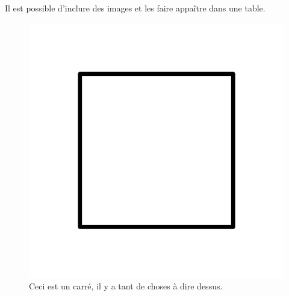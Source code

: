 \documentclass[11pt]{article}
\begin{document}
Il est possible d'inclure des images et les faire appaître dans une table.
\begin{figure}[t]
	\vspace{-0.5cm}
	\includegraphics[width=0.9\linewidth,angle=0]{Carre.png}
	\centering
	\vspace{-1cm}
	\caption[Un carré]{Ceci est un carré, il y a tant de choses à dire dessus.}%
	\label{image:carre}
\end{figure}

\begin{appendix}
	\label{appendix:calculs_en_plus}
\end{appendix}

\clearpage
{}



\clearpage
{}
\listoffigures
\end{document}
